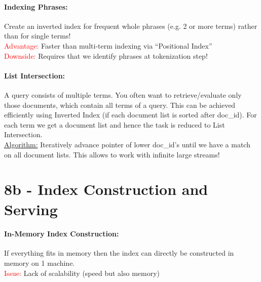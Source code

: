 \documentclass[a4paper,11pt]{article}
\newcommand{\msection}[1]{\section{#1}\vspace{-0.5mm}}
\begin{document}
\begin{multicols}{2}
\paragraph{Indexing Phrases:} Create an inverted index for frequent whole phrases (e.g. 2 or more terms) rather than for single terms! \\
\textcolor{red}{Advantage:} Faster than multi-term indexing via ``Positional Index''\\
\textcolor{red}{Downside:} Requires that we identify phrases at tokenization step!

\paragraph{List Intersection:} A query consists of multiple terms. You often want to retrieve/evaluate only those documents, which contain all terms of a query. This can be achieved efficiently using Inverted Index (if each document list is sorted after doc\_id). For each term we get a document list and hence the task is reduced to List Intersection. \\
\underline{Algorithm:} Iteratively advance pointer of lower doc\_id's until we have a match on all document lists. This allows to work with infinite large streams!

\msection{8b - Index Construction and Serving}
\paragraph{In-Memory Index Construction:} If everything fits in memory then the index can directly be constructed in memory on 1 machine.\\
\textcolor{red}{Issue:} Lack of scalability (speed but also memory)


\end{multicols}
\end{document}
